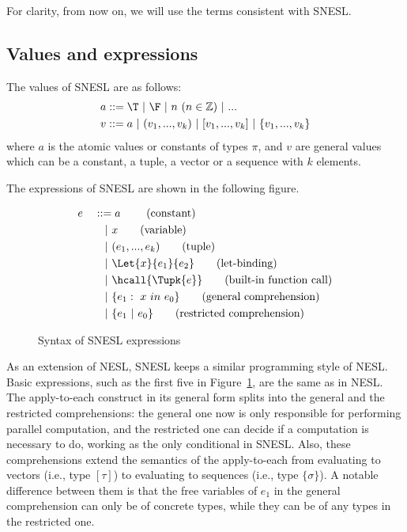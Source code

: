 For clarity, from now on, we will use the terms consistent with SNESL.

\subsection{Values and expressions}

The values of SNESL are as follows:
\begin{align*}
& a ::=  \T \ | \ \F \ | \ n \ (n \in \mathbb{Z}) \ | \ ... \\
& v ::=  a \ | \ (v_1,...,v_k) \ | \ [v_1,...,v_k] \ | \ \{v_1,...,v_k\} 
\end{align*}
where $a$ is the atomic values or constants of types $\pi$, and $v$ are
 general values which can be a constant, a tuple, a vector or a sequence with $k$ elements.  

The expressions of SNESL are shown in the following figure.

\begin{figure}[H]\large 
\begin{alignat*}{2}
& e &&::=  a \     \tag{constant} \\
&   && \quad | \ x  \tag{variable} \\
&   && \quad | \ (e_1,...,e_k) \tag{tuple}\\
&   && \quad | \ \Let{x}{e_1}{e_2} \tag{let-binding}\\
&   && \quad | \ \hcall{\Tupk{e}}  \tag{built-in function call} \\
&   && \quad | \ \{e_1: \ x \ \*{in} \ e_0 \} \tag{general comprehension} \\
&   && \quad | \ \{e_1 \ | \ e_0 \}\tag {restricted comprehension} 
\end{alignat*}
\caption{Syntax of SNESL expressions \label{fig-snesl-exps}}
\end{figure}

As an extension of NESL, SNESL keeps a similar programming style of NESL. 
Basic expressions, such as the first five in Figure~\ref{fig-snesl-exps}, are the same as in NESL. 
The apply-to-each construct in its general form splits into the general and the restricted comprehensions:
the general one now is only responsible for performing parallel computation,
and the restricted one can decide if a computation is necessary to do, working as the only conditional in SNESL.
Also, these comprehensions extend the semantics of the apply-to-each from evaluating to vectors (i.e., type $[\tau]$) to evaluating to sequences (i.e., type $\{\sigma\}$). 
A notable difference between them is that the free variables of $e_1$ in the general comprehension can only be of concrete types, while they can be of any types in the restricted one.

